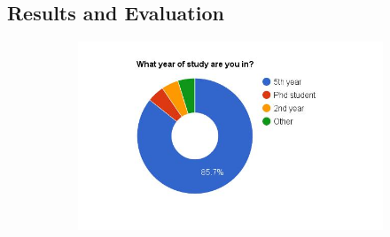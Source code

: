 \subsection{Results and Evaluation}

\begin{figure}
    \centering
    \hspace*{-1.5cm}
    \begin{subfigure}[h]{0.5\textwidth}
        \includegraphics[width=1.5\textwidth, height=1.0\textwidth]{results/year_of_study.jpg}
        \caption{}
        \label{fig:year-of-study}
    \end{subfigure}
    ~ %
    \hfill
    \begin{subfigure}[h]{0.5\textwidth}

\end{subfigure}
\end{figure}
